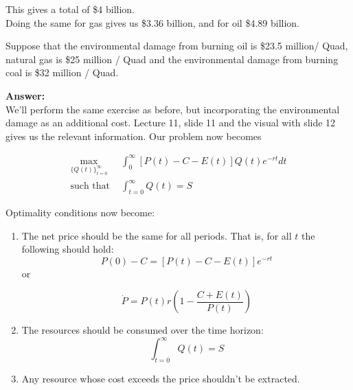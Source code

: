 \begin{enumerate}
\begin{Exercise}
\begin{sol}
    This gives a total of \$4 billion.\\
    
    Doing the same for gas gives us \$3.36 billion, and for oil \$4.89 billion.
    

    
    
    \end{sol}
    

    

\end{Exercise}


\begin{Exercise}{Suppose that the environmental damage from burning oil is \$23.5 million/ Quad, natural gas is \$25 million / Quad and the environmental damage from burning coal is \$32 million / Quad.}
     \begin{sol}
         \textbf{Answer:}\\
         
         We'll perform the same exercise as before, but incorporating the environmental damage as an additional cost. Lecture 11, slide 11 and the visual with slide 12 gives us the relevant information. Our problem now becomes
         
        \begin{equation}
        \begin{split}
            \max_{ \{Q(t)\}_{t=0}^\infty} & \int_{0}^\infty \left[P(t)-C-E(t)\right] Q(t) e^{-rt}dt\\
            \text{such that } & \int_{t=0}^\infty Q(t) = S
        \end{split}
        \label{eq:npv-damage}
        \end{equation}
        
        Optimality conditions now become:
        
        \begin{enumerate}
            \item The net price should be the same for all periods. That is, for all $t$ the following should hold:
            \begin{equation*}
                P(0)-C = [P(t)-C-E(t)]e^{-rt}
            \end{equation*}
            or
            
            \begin{equation}
        \dot{P} = P(t)r\left(1-\frac{C+E(t)}{P(t)}\right)
        \label{eq:opt-envidamage}
            \end{equation}
            \item The resources should be consumed over the time horizon:
            \begin{equation*}
                \int_{t=0}^\infty Q(t) = S
            \end{equation*}
            \item Any resource whose cost exceeds the price shouldn't be extracted.
        \end{enumerate}
        

\end{sol}
\end{Exercise}
\end{enumerate}
